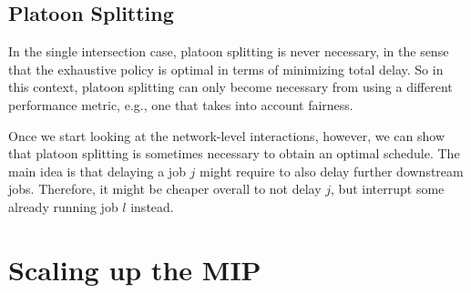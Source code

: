 \documentclass{article}
\begin{document}
\subsection{Platoon Splitting}

In the single intersection case, platoon splitting is never necessary, in the
sense that the exhaustive policy is optimal in terms of minimizing total delay.
So in this context, platoon splitting can only become necessary from using a
different performance metric, e.g., one that takes into account fairness.

Once we start looking at the network-level interactions, however, we can show
that platoon splitting is sometimes necessary to obtain an optimal schedule. The
main idea is that delaying a job $j$ might require to also delay further
downstream jobs. Therefore, it might be cheaper overall to not delay $j$, but
interrupt some already running job $l$ instead.

\section{Scaling up the MIP}
\end{document}
